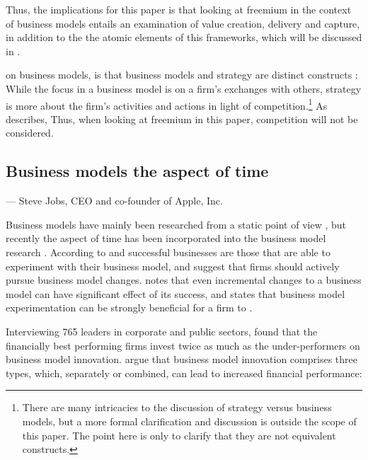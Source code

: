 Thus, the implications for this paper is that looking at freemium in the context of business models entails an examination of value creation, delivery and capture, in addition to the the atomic elements of this frameworks, which will be discussed in .

 on business models, is that business models and strategy are distinct constructs \citep{chesbrough2002,magretta2002,seddon2003,zott2008,teece2010,zott2010b}: While the focus in a business model is on a firm's exchanges with others, strategy is more about the firm's activities and actions in light of competition.\footnote{There are many intricacies to the discussion of strategy versus business models, but a more formal clarification and discussion is outside the scope of this paper. The point here is only to clarify that they are not equivalent constructs.} As \citet{porter1996} describes,  Thus, when looking at freemium in this paper, competition will not be considered.

\subsection{Business models \oldand the aspect of time}
\label{section:businessmodels:time}

 --- Steve Jobs, CEO and co-founder of Apple, Inc.

Business models have mainly been researched from a static point of view \citep{osterwalder2005}, but recently the aspect of time has been incorporated into the business model research \citep{sosna2010}. According to \citet{chesbrough2002} and \citet{chesbrough2010} successful businesses are those that are able to experiment with their business model, and \citet{linder2000} suggest that firms should actively pursue business model changes. \citet{sosna2010} notes that even incremental changes to a business model can have significant effect of its success, and states that business model experimentation can be strongly beneficial for a firm to  \citep[]{sosna2010}.

Interviewing 765 leaders in corporate and public sectors, \citet{rometti2006} found that the financially best performing firms invest twice as much as the under-performers on business model innovation. \citet{giesen2007} argue that business model innovation comprises three types, which, separately or combined, can lead to increased financial performance:


